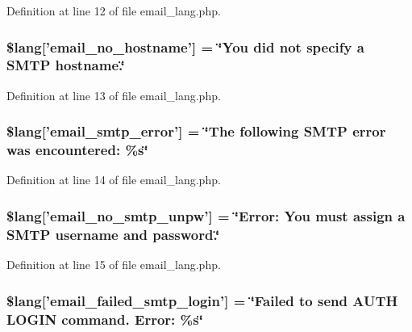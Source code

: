 Definition at line 12 of file email\-\_\-lang.\-php.

\subsubsection[{\$lang}]{\setlength{\rightskip}{0pt plus 5cm}\$lang['email\-\_\-no\-\_\-hostname'] = \char`\"{}You did {\bf not} specify {\bf a} S\-M\-T\-P hostname.\char`\"{}}\label{email__lang_8php_a03905b414e05a5d3cfd0fe88868615f5}


Definition at line 13 of file email\-\_\-lang.\-php.

\subsubsection[{\$lang}]{\setlength{\rightskip}{0pt plus 5cm}\$lang['email\-\_\-smtp\-\_\-error'] = \char`\"{}The following S\-M\-T\-P error was encountered\-: \%{\bf s}\char`\"{}}\label{email__lang_8php_a3d70a704117491053ad9c0b4065ecd3f}


Definition at line 14 of file email\-\_\-lang.\-php.

\subsubsection[{\$lang}]{\setlength{\rightskip}{0pt plus 5cm}\$lang['email\-\_\-no\-\_\-smtp\-\_\-unpw'] = \char`\"{}Error\-: You must assign {\bf a} S\-M\-T\-P username {\bf and} password.\char`\"{}}\label{email__lang_8php_a268c3e96fea16a903e7488f03960e89a}


Definition at line 15 of file email\-\_\-lang.\-php.

\subsubsection[{\$lang}]{\setlength{\rightskip}{0pt plus 5cm}\$lang['email\-\_\-failed\-\_\-smtp\-\_\-login'] = \char`\"{}Failed {\bf to} send A\-U\-T\-H L\-O\-G\-I\-N command. Error\-: \%{\bf s}\char`\"{}}\label{email__lang_8php_a791781c2fd1bd8ec87158be649519621}


